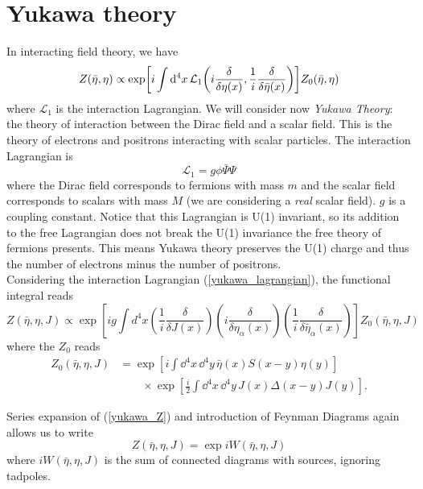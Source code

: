\section{Yukawa theory}
In interacting field theory, we have
\begin{equation}
    Z(\bar{\eta},\eta)\propto\exp[i\int\dd^4x\,\mathcal{L}_1\qty(i\fdv{\eta(x)},\frac{1}{i}\fdv{\bar{\eta}(x)})]Z_0(\bar{\eta},\eta)
\end{equation}
where $\mathcal{L}_1$ is the interaction Lagrangian. We will consider now \textit{Yukawa Theory}: the theory of interaction between the Dirac field and a scalar field. This is the theory of electrons and positrons interacting with scalar particles. The interaction Lagrangian is
\begin{equation}
    \mathcal{L}_1=g\phi\bar{\Psi}\Psi
    \label{yukawa_lagrangian}
\end{equation}
where the Dirac field corresponds to fermions with mass $m$ and the scalar field corresponds to scalars with mass $M$ (we are considering a \textit{real} scalar field). $g$ is a coupling constant. Notice that this Lagrangian is U(1) invariant, so its addition to the free Lagrangian does not break the U(1) invariance the free theory of fermions presents. This means Yukawa theory preserves the U(1) charge and thus the number of electrons minus the number of positrons.\\

Considering the interaction Lagrangian (\ref{yukawa_lagrangian}), the functional integral reads
\begin{equation}
Z(\bar{\eta}, \eta, J) \propto \exp \left[i g \int d^{4} x\left(\frac{1}{i} \frac{\delta}{\delta J(x)}\right)\left(i \frac{\delta}{\delta \eta_{\alpha}(x)}\right)\left(\frac{1}{i} \frac{\delta}{\delta \bar{\eta}_{\alpha}(x)}\right)\right] Z_{0}(\bar{\eta}, \eta, J)
\label{yukawa_Z}
\end{equation}
where the $Z_0$ reads
\begin{equation}
\begin{aligned}
Z_{0}(\bar{\eta}, \eta, J)&= \exp \left[i \int \dd^{4} x\, \dd^{4} y\, \bar{\eta}(x) S(x-y) \eta(y)\right] \\ &\qquad\times
\exp \left[\frac{i}{2} \int \dd^{4} x\, \dd^{4} y\, J(x) \Delta(x-y) J(y)\right].
\end{aligned}
\end{equation}

Series expansion of (\ref{yukawa_Z}) and introduction of Feynman Diagrams again allows us to write
\begin{equation}
    Z(\bar{\eta},\eta,J)=\exp iW(\bar{\eta},\eta,J)
\end{equation}
where $iW(\bar{\eta},\eta,J)$ is the sum of connected diagrams with sources, ignoring tadpoles. \\

